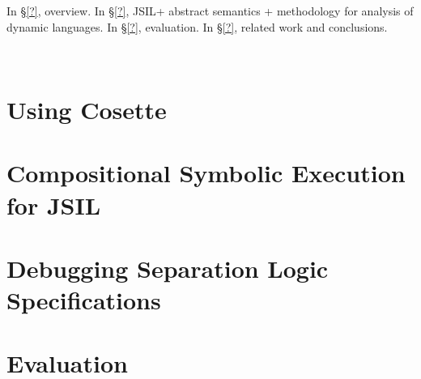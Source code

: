 \documentclass[sigconf, anonymous, review]{acmart}
\newcommand{\jsil}{JSIL\xspace}
\newcommand{\polish}[1]{{\color{red}#1}}
\newcommand{\cosette}{Cosette\xspace}
\newcommand{\myparagraph}[1]{\smallskip\noindent {\bf #1.}\hspace{1pt}}
\newif\ifComments
\newcommand{\pmax}[1]{%
\ifComments
\begin{center}
\fbox{\begin{minipage}{0.4\textwidth} \color{blue}
{\rm PM: \small #1}
\end{minipage}}
\end{center}
\fi}
\begin{document}
\pmax{I would like a summary of what is where.}

In \S\ref{?}, overview. In \S\ref{?}, \jsil + abstract semantics + methodology for analysis of dynamic languages. In \S\ref{?}, evaluation. In \S\ref{?}, related work and conclusions.

\newpage

%
%
%
%




\newpage \ \newpage
\section{Using \cosette}\label{sec:overview}



\newpage
\section{Compositional Symbolic Execution for \jsil}\label{sec:jsil:symb:exec}


\section{Debugging Separation Logic Specifications}\label{sec:specs}
%

\newpage
\section{Evaluation}\label{sec:evaluation}

\end{document}
